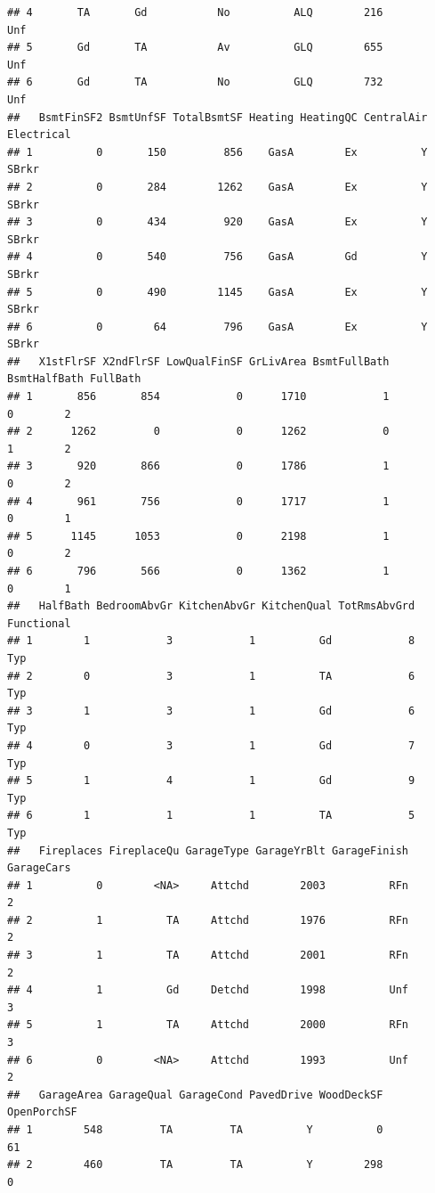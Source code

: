 \documentclass[
]{article}
\begin{document}
\begin{verbatim}
## 4       TA       Gd           No          ALQ        216          Unf
## 5       Gd       TA           Av          GLQ        655          Unf
## 6       Gd       TA           No          GLQ        732          Unf
##   BsmtFinSF2 BsmtUnfSF TotalBsmtSF Heating HeatingQC CentralAir Electrical
## 1          0       150         856    GasA        Ex          Y      SBrkr
## 2          0       284        1262    GasA        Ex          Y      SBrkr
## 3          0       434         920    GasA        Ex          Y      SBrkr
## 4          0       540         756    GasA        Gd          Y      SBrkr
## 5          0       490        1145    GasA        Ex          Y      SBrkr
## 6          0        64         796    GasA        Ex          Y      SBrkr
##   X1stFlrSF X2ndFlrSF LowQualFinSF GrLivArea BsmtFullBath BsmtHalfBath FullBath
## 1       856       854            0      1710            1            0        2
## 2      1262         0            0      1262            0            1        2
## 3       920       866            0      1786            1            0        2
## 4       961       756            0      1717            1            0        1
## 5      1145      1053            0      2198            1            0        2
## 6       796       566            0      1362            1            0        1
##   HalfBath BedroomAbvGr KitchenAbvGr KitchenQual TotRmsAbvGrd Functional
## 1        1            3            1          Gd            8        Typ
## 2        0            3            1          TA            6        Typ
## 3        1            3            1          Gd            6        Typ
## 4        0            3            1          Gd            7        Typ
## 5        1            4            1          Gd            9        Typ
## 6        1            1            1          TA            5        Typ
##   Fireplaces FireplaceQu GarageType GarageYrBlt GarageFinish GarageCars
## 1          0        <NA>     Attchd        2003          RFn          2
## 2          1          TA     Attchd        1976          RFn          2
## 3          1          TA     Attchd        2001          RFn          2
## 4          1          Gd     Detchd        1998          Unf          3
## 5          1          TA     Attchd        2000          RFn          3
## 6          0        <NA>     Attchd        1993          Unf          2
##   GarageArea GarageQual GarageCond PavedDrive WoodDeckSF OpenPorchSF
## 1        548         TA         TA          Y          0          61
## 2        460         TA         TA          Y        298           0

\end{verbatim}
\end{document}
